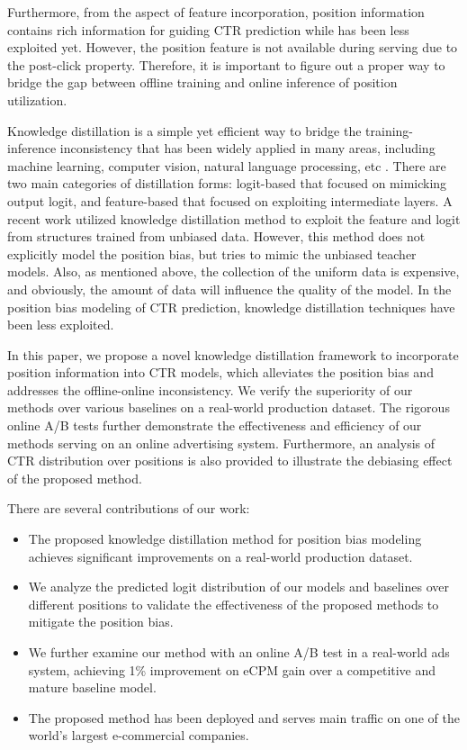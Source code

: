 \documentclass[sigconf,natbib=true,anonymous=false]{acmart}
\begin{document}
Furthermore, from the aspect of feature incorporation, position information contains rich information for guiding CTR prediction while has been less exploited yet.  
However, the position feature is not available during serving due to the post-click property. 
Therefore, it is important to figure out a proper way to bridge the gap between offline training and online inference of position utilization.

Knowledge distillation is a simple yet efficient way to bridge the training-inference inconsistency that has been widely applied in many areas, including machine learning, computer vision, natural language processing, etc \cite{hinton2015distilling,touvron2021training,sanh2019distilbert,jiao2019tinybert,wang2021knowledge,papernot2016distillation}.
There are two main categories of distillation forms: logit-based that focused on mimicking output logit, and feature-based that focused on exploiting intermediate layers.  
A recent work \cite{liu2020general} utilized knowledge distillation method to exploit the feature and logit from structures trained from unbiased data.
However, this method does not explicitly model the position bias, but tries to mimic the unbiased teacher models.
Also, as mentioned above, the collection of the uniform data is expensive, and obviously, the amount of data will influence the quality of the model.
In the position bias modeling of CTR prediction, knowledge distillation techniques have been less exploited.

In this paper, we propose a novel knowledge distillation framework to incorporate position information into CTR models, which alleviates the position bias and addresses the offline-online inconsistency.
We verify the superiority of our methods over various baselines on a real-world production dataset.
The rigorous online A/B tests further demonstrate the effectiveness and efficiency of our methods serving on an online advertising system.
Furthermore, an analysis of CTR distribution over positions is also provided to illustrate the debiasing effect of the proposed method. 



There are several contributions of our work:
 \begin{itemize}
     \item The proposed knowledge distillation method for position bias modeling achieves significant improvements on a real-world production dataset. 
     \item We analyze the predicted logit distribution of our models and baselines over different positions to validate the effectiveness of the proposed methods to mitigate the position bias.
     \item We further examine our method with an online A/B test in a real-world ads system, achieving 1\% improvement on eCPM gain over a competitive and mature baseline model. 
     \item The proposed method has been deployed and serves main traffic on one of the world's largest e-commercial companies.
 \end{itemize}
\end{document}
